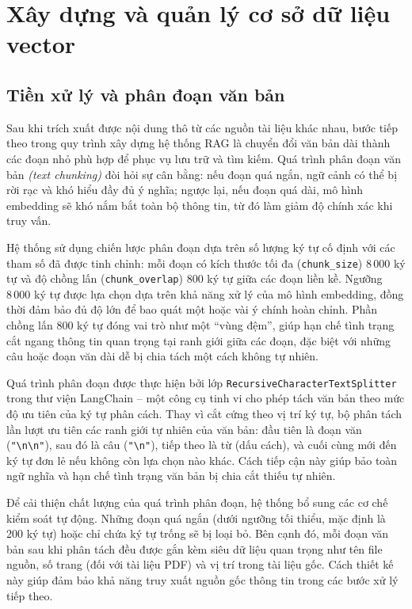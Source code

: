 \section{Xây dựng và quản lý cơ sở dữ liệu vector}

\subsection{Tiền xử lý và phân đoạn văn bản}

Sau khi trích xuất được nội dung thô từ các nguồn tài liệu khác nhau, bước tiếp theo trong quy trình xây dựng hệ thống RAG là chuyển đổi văn bản dài thành các đoạn nhỏ phù hợp để phục vụ lưu trữ và tìm kiếm. Quá trình phân đoạn văn bản \emph{(text chunking)} đòi hỏi sự cân bằng: nếu đoạn quá ngắn, ngữ cảnh có thể bị rời rạc và khó hiểu đầy đủ ý nghĩa; ngược lại, nếu đoạn quá dài, mô hình embedding sẽ khó nắm bắt toàn bộ thông tin, từ đó làm giảm độ chính xác khi truy vấn.

Hệ thống sử dụng chiến lược phân đoạn dựa trên số lượng ký tự cố định với các tham số đã được tinh chỉnh: mỗi đoạn có kích thước tối đa (\texttt{chunk\_size}) \(8\,000\) ký tự và độ chồng lấn (\texttt{chunk\_overlap}) \(800\) ký tự giữa các đoạn liền kề. Ngưỡng \(8\,000\) ký tự được lựa chọn dựa trên khả năng xử lý của mô hình embedding, đồng thời đảm bảo đủ độ lớn để bao quát một hoặc vài ý chính hoàn chỉnh. Phần chồng lấn \(800\) ký tự đóng vai trò như một ``vùng đệm'', giúp hạn chế tình trạng cắt ngang thông tin quan trọng tại ranh giới giữa các đoạn, đặc biệt với những câu hoặc đoạn văn dài dễ bị chia tách một cách không tự nhiên.

Quá trình phân đoạn được thực hiện bởi lớp \texttt{RecursiveCharacterTextSplitter} trong thư viện LangChain -- một công cụ tinh vi cho phép tách văn bản theo mức độ ưu tiên của ký tự phân cách. Thay vì cắt cứng theo vị trí ký tự, bộ phân tách lần lượt ưu tiên các ranh giới tự nhiên của văn bản: đầu tiên là đoạn văn (\texttt{"\textbackslash n\textbackslash n"}), sau đó là câu (\texttt{"\textbackslash n"}), tiếp theo là từ (dấu cách), và cuối cùng mới đến ký tự đơn lẻ nếu không còn lựa chọn nào khác. Cách tiếp cận này giúp bảo toàn ngữ nghĩa và hạn chế tình trạng văn bản bị chia cắt thiếu tự nhiên.


Để cải thiện chất lượng của quá trình phân đoạn, hệ thống bổ sung các cơ chế kiểm soát tự động. Những đoạn quá ngắn (dưới ngưỡng tối thiểu, mặc định là 200 ký tự) hoặc chỉ chứa ký tự trống sẽ bị loại bỏ. Bên cạnh đó, mỗi đoạn văn bản sau khi phân tách đều được gắn kèm siêu dữ liệu quan trọng như tên file nguồn, số trang (đối với tài liệu PDF) và vị trí trong tài liệu gốc. Cách thiết kế này giúp đảm bảo khả năng truy xuất nguồn gốc thông tin trong các bước xử lý tiếp theo.

